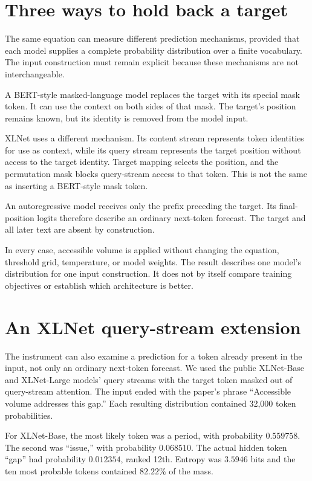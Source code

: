 \documentclass[11pt,a4paper]{article}
\begin{document}
\section{Three ways to hold back a target}
The same equation can measure different prediction mechanisms, provided that each model supplies a complete probability distribution over a finite vocabulary. The input construction must remain explicit because these mechanisms are not interchangeable.

A BERT-style masked-language model replaces the target with its special mask token. It can use the context on both sides of that mask. The target's position remains known, but its identity is removed from the model input.

XLNet uses a different mechanism. Its content stream represents token identities for use as context, while its query stream represents the target position without access to the target identity. Target mapping selects the position, and the permutation mask blocks query-stream access to that token. This is not the same as inserting a BERT-style mask token.

An autoregressive model receives only the prefix preceding the target. Its final-position logits therefore describe an ordinary next-token forecast. The target and all later text are absent by construction.

In every case, accessible volume is applied without changing the equation, threshold grid, temperature, or model weights. The result describes one model's distribution for one input construction. It does not by itself compare training objectives or establish which architecture is better.

\section{An XLNet query-stream extension}
The instrument can also examine a prediction for a token already present in the input, not only an ordinary next-token forecast. We used the public XLNet-Base and XLNet-Large models' query streams with the target token masked out of query-stream attention. The input ended with the paper's phrase ``Accessible volume addresses this gap.'' Each resulting distribution contained 32,000 token probabilities.

For XLNet-Base, the most likely token was a period, with probability $0.559758$. The second was ``issue,'' with probability $0.068510$. The actual hidden token ``gap'' had probability $0.012354$, ranked 12th. Entropy was $3.5946$ bits and the ten most probable tokens contained $82.22\%$ of the mass.
\end{document}
